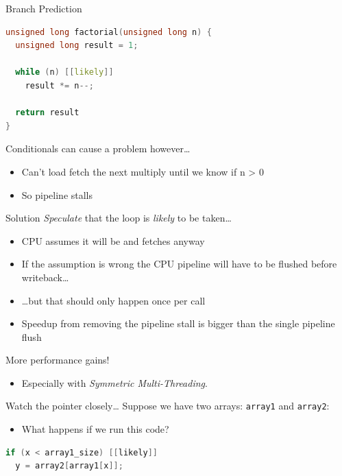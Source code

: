 \documentclass[9pt,aspectratio=169]{beamer}
\begin{document}
\begin{frame}[label={sec:org47b3f75},fragile]{Branch Prediction}
 \begin{lstlisting}[language=C++,numbers=none]
unsigned long factorial(unsigned long n) {
  unsigned long result = 1;

  while (n) [[likely]]
    result *= n--;

  return result
}
\end{lstlisting}

Conditionals can cause a problem however\ldots{}
\begin{itemize}
\item Can't load fetch the next multiply until we know if n > 0
\item So pipeline stalls
\end{itemize}

\begin{block}{Solution}
\emph{Speculate} that the loop is \emph{likely} to be taken\ldots{}
\begin{itemize}
\item CPU assumes it will be and fetches anyway
\item If the assumption is wrong the CPU pipeline will have to be flushed before writeback\ldots{}
\item \ldots{}but that should only happen once per call
\item Speedup from removing the pipeline stall is bigger than the single pipeline flush
\end{itemize}

More performance gains!
\begin{itemize}
\item Especially with \emph{Symmetric Multi-Threading}.
\end{itemize}
\end{block}
\end{frame}

\begin{frame}[label={sec:orgd907e1a},fragile]{Watch the pointer closely\ldots{}}
 Suppose we have two arrays: \texttt{array1} and \texttt{array2}:
\begin{itemize}
\item What happens if we run this code?
\end{itemize}

\begin{lstlisting}[language=C,numbers=none]
if (x < array1_size) [[likely]]
  y = array2[array1[x]];
\end{lstlisting}
\end{frame}
\end{document}
